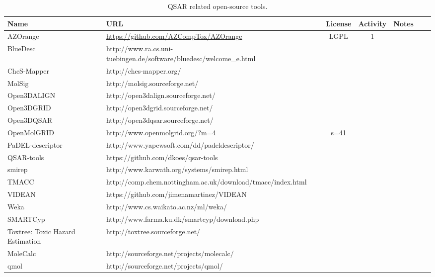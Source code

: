 \begin{table} 
    \begin{tabular}{ l l c c c c c }
    Name & URL & License & Activity & Notes \\ \hline
        AZOrange & \url{https://github.com/AZCompTox/AZOrange} & LGPL & 1 & \cite{St_lring_2011}\\ 
        BlueDesc & http://www.ra.cs.uni-tuebingen.de/software/bluedesc/welcome_e.html \\ 
        CheS-Mapper &  http://ches-mapper.org/ \\ 
        MolSig & http://molsig.sourceforge.net/ \\ 
        Open3DALIGN &  http://open3dalign.sourceforge.net/ \\ 
        Open3DGRID &  http://open3dgrid.sourceforge.net/ \\ 
        Open3DQSAR &  http://open3dqsar.sourceforge.net/ \\ 
        OpenMolGRID &  http://www.openmolgrid.org/?m=4&s=41 \\ 
        PaDEL-descriptor &  http://www.yapcwsoft.com/dd/padeldescriptor/ \\ 
        QSAR-tools &  https://github.com/dkoes/qsar-tools \\ 
        smirep &  http://www.karwath.org/systems/smirep.html \\ 
        TMACC &  http://comp.chem.nottingham.ac.uk/download/tmacc/index.html \\ 
        VIDEAN &  https://github.com/jimenamartinez/VIDEAN \\ 
        Weka &  http://www.cs.waikato.ac.nz/ml/weka/ \\ 
        SMARTCyp &  http://www.farma.ku.dk/smartcyp/download.php \\ 
        Toxtree: Toxic Hazard Estimation &  http://toxtree.sourceforge.net/ \\ 
        MoleCalc &  http://sourceforge.net/projects/molecalc/ \\ 
        qmol &  http://sourceforge.net/projects/qmol/ \\ 
    \end{tabular} 
    \caption{\label{qsartable} QSAR related open-source tools.}
\end{table}